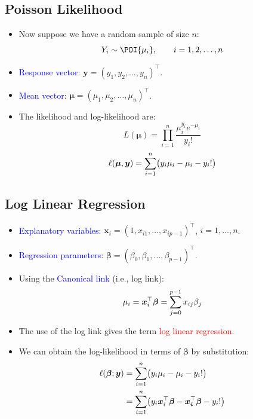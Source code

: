 \documentclass[oneside]{book}\usepackage[]{graphicx}\usepackage[svgnames]{xcolor}
\let\exp\relax%
\let\log\relax%
\providecommand{\Vector}[1]{\bm{#1}}%
\begin{document}
\subsection*{Poisson Likelihood}
\begin{itemize}
      \item Now suppose we have a random sample of size $ n $:
            \[ Y_i \sim \POI{\mu_i},\qquad i=1,2,\ldots,n \]
      \item \textcolor{Blue}{Response vector}: $ \Vector{y}=(y_1,y_2,\ldots,y_n)^\top $.
      \item \textcolor{Blue}{Mean vector}: $ \Vector{\mu}=(\mu_1,\mu_2,\ldots,\mu_n)^\top $.
      \item The likelihood and log-likelihood are:
            \[ L(\Vector{\mu})=\prod_{i=1}^n \frac{\mu_i^{y_i}e^{-\mu_i}}{y_i!}  \]
            \[ \ell(\Vector{\mu},\Vector{y})=\sum_{i=1}^{n} \bigl(y_i\log{\mu_i}-\mu_i-\log{y_i!}\bigr) \]
\end{itemize}
\subsection*{Log Linear Regression}
\begin{itemize}
      \item \textcolor{Blue}{Explanatory variables}: $ \Vector{x}_i=(1,x_{i1},\ldots,x_{ip-1})^\top $, $ i=1,\ldots,n $.
      \item \textcolor{Blue}{Regression parameters}: $ \Vector{\beta}=(\beta_0,\beta_1,\ldots,\beta_{p-1})^\top $.
      \item Using the \textcolor{Blue}{Canonical link} (i.e., log link):
            \[ \log{\mu_i}=\Vector{x}_i^\top \Vector{\beta}=\sum_{j=0}^{p-1} x_{ij}\beta_j \]
      \item The use of the log link gives the term \textcolor{Red}{log linear regression}.
      \item We can obtain the log-likelihood in terms of $ \Vector{\beta} $ by substitution:
            \begin{align*}
                  \ell(\Vector{\beta};\Vector{y})
                   & =\sum_{i=1}^{n} \bigl(y_i\log{\mu}_i-\mu_i-\log{y_i!}\bigr)                                                        \\
                   & =\sum_{i=1}^{n} \bigl(y_i \Vector{x}_i^\top \Vector{\beta}-\exp{\Vector{x_i}^\top \Vector{\beta}}-\log{y_i!}\bigr)
            \end{align*}
\end{itemize}
\end{document}
